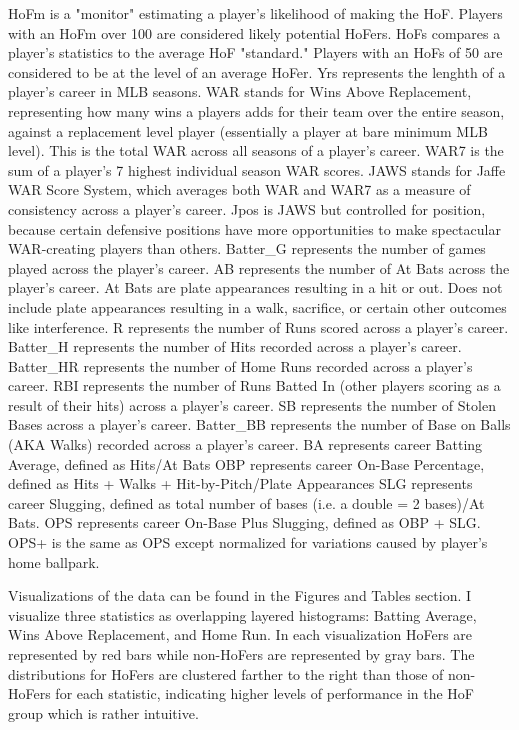 \documentclass[12pt,english]{article}
\begin{document}
HoFm is a "monitor" estimating a player's likelihood of making the HoF. Players with an HoFm over 100 are considered likely potential HoFers. HoFs compares a player's statistics to the average HoF "standard." Players with an HoFs of 50 are considered to be at the level of an average HoFer. Yrs represents the lenghth of a player's career in MLB seasons. WAR stands for Wins Above Replacement, representing how many wins a players adds for their team over the entire season, against a replacement level player (essentially a player at bare minimum MLB level). This is the total WAR across all seasons of a player's career. WAR7 is the sum of a player's 7 highest individual season WAR scores. JAWS stands for Jaffe WAR Score System, which averages both WAR and WAR7 as a measure of consistency across a player's career. Jpos is JAWS but controlled for position, because certain defensive positions have more opportunities to make spectacular WAR-creating players than others. Batter\_G represents the number of games played across the player's career. AB represents the number of At Bats across the player's career. At Bats are plate appearances resulting in a hit or out. Does not include plate appearances resulting in a walk, sacrifice, or certain other outcomes like interference. R represents the number of Runs scored across a player's career. Batter\_H represents the number of Hits recorded across a player's career. Batter\_HR represents the number of Home Runs recorded across a player's career. RBI represents the number of Runs Batted In (other players scoring as a result of their hits) across a player's career. SB represents the number of Stolen Bases across a player's career. Batter\_BB represents the number of Base on Balls (AKA Walks) recorded across a player's career. BA represents career Batting Average, defined as Hits/At Bats OBP represents career On-Base Percentage, defined as Hits + Walks + Hit-by-Pitch/Plate Appearances SLG represents career Slugging, defined as total number of bases (i.e. a double = 2 bases)/At Bats. OPS represents career On-Base Plus Slugging, defined as OBP + SLG. OPS+ is the same as OPS except normalized for variations caused by player's home ballpark.

Visualizations of the data can be found in the Figures and Tables section. I visualize three statistics as overlapping layered histograms: Batting Average, Wins Above Replacement, and Home Run. In each visualization HoFers are represented by red bars while non-HoFers are represented by gray bars. The distributions for HoFers are clustered farther to the right than those of non-HoFers for each statistic, indicating higher levels of performance in the HoF group which is rather intuitive. 
    
\end{document}
